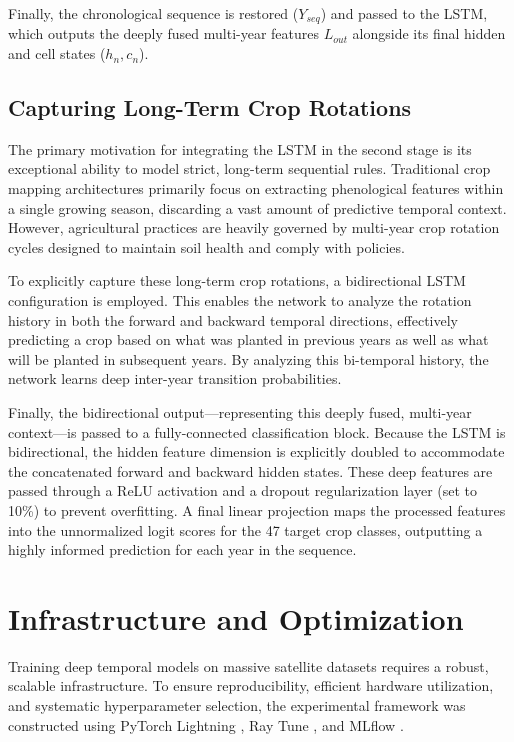 Finally, the chronological sequence is restored ($Y_{seq}$) and passed to the LSTM, which outputs the deeply fused multi-year
features $L_{out}$ alongside its final hidden and cell states ($h_n, c_n$).

\subsection{Capturing Long-Term Crop Rotations}
\label{subsec:crop_rotations}

The primary motivation for integrating the LSTM in the second stage is its exceptional ability to model strict, long-term sequential rules.
Traditional crop mapping architectures primarily focus on extracting phenological features within a single growing season, discarding a vast amount of predictive temporal context.
However, agricultural practices are heavily governed by multi-year crop rotation cycles designed to maintain soil health and comply with policies.

To explicitly capture these long-term crop rotations, a bidirectional LSTM configuration is employed.
This enables the network to analyze the rotation history in both the forward and backward temporal directions,
effectively predicting a crop based on what was planted in previous years as well as what will be planted in subsequent years.
By analyzing this bi-temporal history, the network learns deep inter-year transition probabilities.

Finally, the bidirectional output---representing this deeply fused, multi-year context---is passed to a fully-connected classification block.
Because the LSTM is bidirectional, the hidden feature dimension is explicitly doubled to accommodate the concatenated forward and backward hidden states.
These deep features are passed through a ReLU activation and a dropout regularization layer (set to 10\%) to prevent overfitting.
A final linear projection maps the processed features into the unnormalized logit scores for the 47 target crop classes,
outputting a highly informed prediction for each year in the sequence.


\section{Infrastructure and Optimization}
\label{sec:infrastructure}

Training deep temporal models on massive satellite datasets requires a robust, scalable infrastructure.
To ensure reproducibility, efficient hardware utilization, and systematic hyperparameter selection,
the experimental framework was constructed using PyTorch Lightning \cite{falcon2019pytorch}, Ray Tune \cite{liaw2018tune}, and MLflow \cite{zaharia2018accelerating}.

